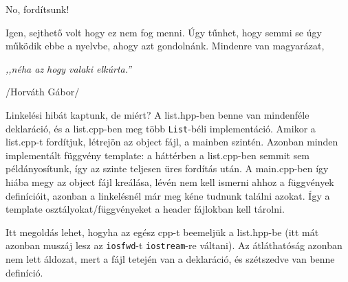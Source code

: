 \documentclass[a4paper,11.5pt,table]{article}
\begin{document}
	\medskip
	No, fordítsunk!
	
	\medskip
	Igen, sejthető volt hogy ez nem fog menni. Úgy tűnhet, hogy semmi se úgy működik ebbe a nyelvbe, ahogy azt gondolnánk. Mindenre van magyarázat,
	\begin{center}
		\textit{,,néha az hogy valaki elkúrta.''}
		
		/Horváth Gábor/
	\end{center}
	Linkelési hibát kaptunk, de miért? A list.hpp-ben benne van mindenféle deklaráció, és a list.cpp-ben meg több \texttt{List}-béli implementáció. Amikor a list.cpp-t fordítjuk, létrejön az object fájl, a mainben szintén. Azonban minden implementált függvény template: a háttérben a list.cpp-ben semmit sem példányosítunk, így az szinte teljesen üres fordítás után. A main.cpp-ben így hiába megy az object fájl kreálása, lévén nem kell ismerni ahhoz a függvények definícióit, azonban a linkelésnél már meg kéne tudnunk találni azokat. Így a template osztályokat/függvényeket a header fájlokban kell tárolni.
	
	Itt megoldás lehet, hogyha az egész cpp-t beemeljük a list.hpp-be (itt mát azonban muszáj lesz az \texttt{iosfwd}-t \texttt{iostream}-re váltani). Az átláthatóság azonban nem lett áldozat, mert a fájl tetején van a deklaráció, és szétszedve van benne definíció.
	
\end{document}
